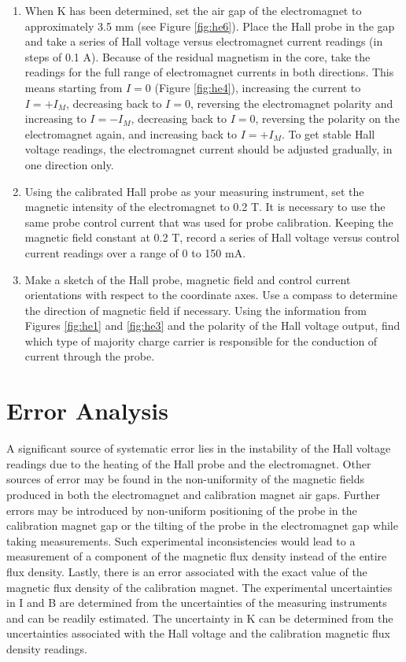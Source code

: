 \begin{enumerate}
\item When K has been determined, set the air gap of the electromagnet to approximately 3.5 mm (see Figure \ref{fig:he6}). Place the Hall probe in the gap and take a series of Hall voltage versus electromagnet current readings (in steps of 0.1 A). Because of the residual magnetism in the core, take the readings for the full range of electromagnet currents in both directions. This means starting from $I=0$ (Figure \ref{fig:he4}), increasing the current to $I=+I_M$, decreasing back to $I=0$, reversing the electromagnet polarity and increasing to $I=-I_M$, decreasing back to $I=0$, reversing the polarity on the electromagnet again, and increasing back to $I=+I_M$. To get stable Hall voltage readings, the electromagnet current should be adjusted gradually, in one direction only.

\item Using the calibrated Hall probe as your measuring instrument, set the magnetic intensity of the electromagnet to 0.2 T. It is necessary to use the same probe control current that was used for probe calibration. Keeping the magnetic field constant at 0.2 T, record a series of Hall voltage versus control current readings over a range of 0 to 150 mA.

\item Make a sketch of the Hall probe, magnetic field and control current orientations with respect to the coordinate axes. Use a compass to determine the direction of magnetic field if necessary. Using the information from Figures \ref{fig:he1} and \ref{fig:he3} and the polarity of the Hall voltage output, find which type of majority charge carrier is responsible for the conduction of current through the probe.

\end{enumerate}

\section{Error Analysis}

A significant source of systematic error lies in the instability of the Hall voltage readings due to the heating of the Hall probe and the electromagnet. Other sources of error may be found in the non-uniformity of the magnetic fields produced in both the electromagnet and calibration magnet air gaps. Further errors may be introduced by non-uniform positioning of the probe in the calibration magnet gap or the tilting of the probe in the electromagnet gap while taking measurements. Such experimental inconsistencies would lead to a measurement of a component of the magnetic flux density instead of the entire flux density. Lastly, there is an error associated with the exact value of the magnetic flux density of the calibration magnet. The experimental uncertainties in I and B are determined from the uncertainties of the measuring instruments and can be readily estimated. The uncertainty in K can be determined from the uncertainties associated with the Hall voltage and the calibration magnetic flux density readings. 


